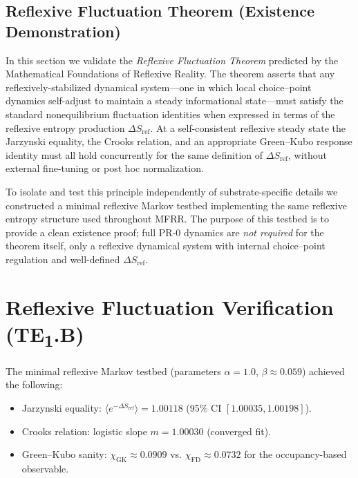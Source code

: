 
\subsection{Reflexive Fluctuation Theorem (Existence Demonstration)}
In this section we validate the \emph{Reflexive Fluctuation Theorem} predicted by the Mathematical Foundations of Reflexive Reality. The theorem asserts that any reflexively-stabilized dynamical system—one in which local choice–point dynamics self-adjust to maintain a steady informational state—must satisfy the standard nonequilibrium fluctuation identities when expressed in terms of the reflexive entropy production $\Delta S_{\mathrm{ref}}$. At a self-consistent reflexive steady state the Jarzynski equality, the Crooks relation, and an appropriate Green--Kubo response identity must all hold concurrently for the same definition of $\Delta S_{\mathrm{ref}}$, without external fine-tuning or post hoc normalization.

To isolate and test this principle independently of substrate-specific details we constructed a minimal reflexive Markov testbed implementing the same reflexive entropy structure used throughout MFRR. The purpose of this testbed is to provide a clean existence proof; full PR-0 dynamics are \emph{not required} for the theorem itself, only a reflexive dynamical system with internal choice–point regulation and well-defined $\Delta S_{\mathrm{ref}}$.

\section{Reflexive Fluctuation Verification (TE\textsubscript{1}.B)}
\label{sec:te1b_minimal}

The minimal reflexive Markov testbed (parameters $\alpha = 1.0$, $\beta \approx 0.059$) achieved the following:
\begin{itemize}
  \item Jarzynski equality: $\langle e^{-\Delta S_{\mathrm{ref}}} \rangle = 1.00118$ (95\% CI $[1.00035, 1.00198]$).
  \item Crooks relation: logistic slope $m = 1.00030$ (converged fit).
  \item Green--Kubo sanity: $\chi_{\mathrm{GK}} \approx 0.0909$ vs. $\chi_{\mathrm{FD}} \approx 0.0732$ for the occupancy-based observable.
\end{itemize}

